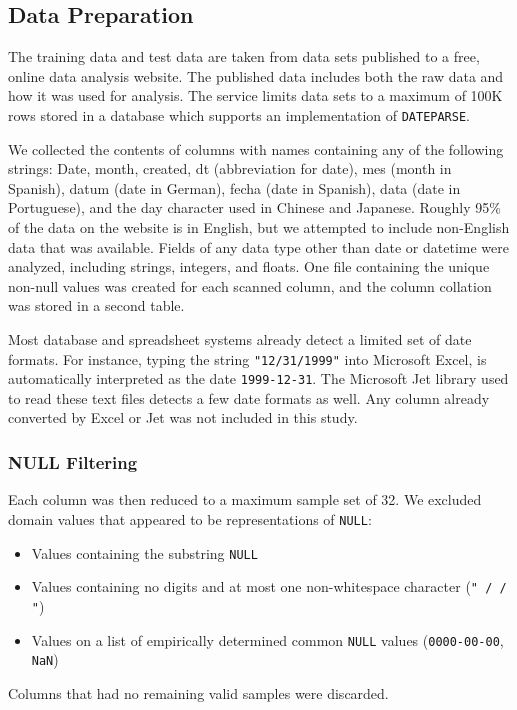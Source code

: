 \subsection{Data Preparation}

The training data and test data are taken from data sets published to a free, online data analysis website. The published data includes both the raw data and how it was used for analysis. The service limits data sets to a maximum of 100K rows stored in a database which supports an implementation of \texttt{DATEPARSE}.  

We collected the contents of columns with names containing any of the following strings: Date, month, created, dt (abbreviation for date), mes (month in Spanish), datum (date in German), fecha (date in Spanish), data (date in Portuguese), and the day character used in Chinese and Japanese. Roughly 95\% of the data on the website is in English, but we attempted to include non-English data that was available. Fields of any data type other than date or datetime were analyzed, including strings, integers, and floats. One file containing the unique non-null values was created for each scanned column, and the column collation was stored in a second table.

Most database and spreadsheet systems already detect a limited set of date formats. For instance, typing the string \texttt{"12/31/1999"} into Microsoft Excel, is automatically interpreted as the date \texttt{1999-12-31}. The Microsoft Jet library used to read these text files detects a few date formats as well. Any column already converted by Excel or Jet was not included in this study.


\subsubsection{NULL Filtering}
Each column was then reduced to a maximum sample set of 32. We excluded domain values that appeared to be representations of \texttt{NULL}:
\begin{itemize}
\item Values containing the substring \texttt{NULL}
\item Values containing no digits and at most one non-whitespace character (\eg \texttt{" / / "})
\item Values on a list of empirically determined common \texttt{NULL} values (\eg \texttt{0000-00-00}, \texttt{NaN})
\end{itemize}
Columns that had no remaining valid samples were discarded. 

